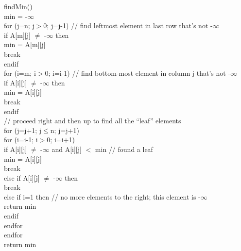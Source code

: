 \documentclass{article}[12pt]
\begin{document}
findMin() \\
  \indent min = -$\infty$ \\
  \indent for (j=n; j$>$0; j=j-1) \textrm{// find leftmost element in last row that's not -$\infty$} \\
  \indent \indent if A[m][j] $\neq$ -$\infty$ then \\
  \indent \indent \indent min = A[m][j] \\
  \indent \indent \indent break \\
  \indent \indent endif \\ 
  \indent for (i=m; i$>$0; i=i-1) \textrm{// find bottom-most element in column j that's not -$\infty$} \\
  \indent \indent if A[i][j] $\neq$ -$\infty$ then \\
  \indent \indent \indent min = A[i][j] \\
  \indent \indent \indent break \\
  \indent \indent endif \\
  \indent \textrm{// proceed right and then up to find all the ``leaf'' elements} \\
  \indent for (j=j+1; j$\leq$n; j=j+1) \\
  \indent \indent for (i=i-1; i$>$0; i=i+1) \\
  \indent \indent \indent if A[i][j] $\neq$ -$\infty$ and A[i][j] $<$ min \textrm{// found a leaf} \\
  \indent \indent \indent \indent min = A[i][j] \\
  \indent \indent \indent \indent break \\
  \indent \indent \indent else if A[i][j] $\neq$ -$\infty$ then \\
  \indent \indent \indent \indent break \\
  \indent \indent \indent else if i=1 then \textrm{// no more elements to the right; this element is -$\infty$} \\
  \indent \indent \indent \indent return min \\
  \indent \indent \indent endif \\
  \indent \indent endfor \\
  \indent endfor \\
  \indent return min \\ \\
\end{document}
